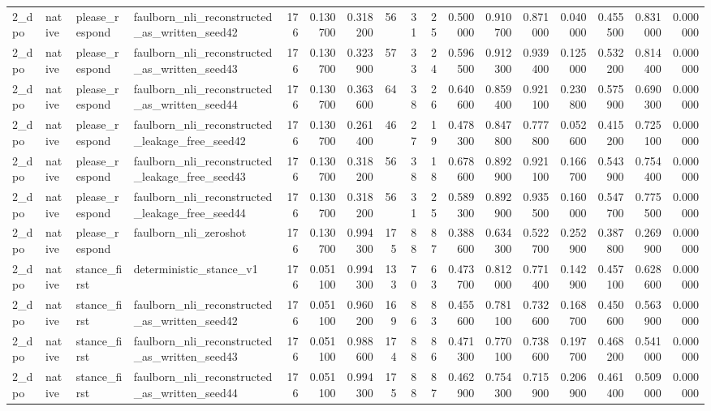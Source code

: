 \begin{tabular}{llllrrrrrrrrrrrrr}
2_dpo & native & please_respond & faulborn_nli_reconstructed_as_written_seed42 & 176 & 0.130700 & 0.318200 & 56 & 31 & 25 & 0.500000 & 0.910700 & 0.871000 & 0.040000 & 0.455500 & 0.831000 & 0.000000 \\
2_dpo & native & please_respond & faulborn_nli_reconstructed_as_written_seed43 & 176 & 0.130700 & 0.323900 & 57 & 33 & 24 & 0.596500 & 0.912300 & 0.939400 & 0.125000 & 0.532200 & 0.814400 & 0.000000 \\
2_dpo & native & please_respond & faulborn_nli_reconstructed_as_written_seed44 & 176 & 0.130700 & 0.363600 & 64 & 38 & 26 & 0.640600 & 0.859400 & 0.921100 & 0.230800 & 0.575900 & 0.690300 & 0.000000 \\
2_dpo & native & please_respond & faulborn_nli_reconstructed_leakage_free_seed42 & 176 & 0.130700 & 0.261400 & 46 & 27 & 19 & 0.478300 & 0.847800 & 0.777800 & 0.052600 & 0.415200 & 0.725100 & 0.000000 \\
2_dpo & native & please_respond & faulborn_nli_reconstructed_leakage_free_seed43 & 176 & 0.130700 & 0.318200 & 56 & 38 & 18 & 0.678600 & 0.892900 & 0.921100 & 0.166700 & 0.543900 & 0.754400 & 0.000000 \\
2_dpo & native & please_respond & faulborn_nli_reconstructed_leakage_free_seed44 & 176 & 0.130700 & 0.318200 & 56 & 31 & 25 & 0.589300 & 0.892900 & 0.935500 & 0.160000 & 0.547700 & 0.775500 & 0.000000 \\
2_dpo & native & please_respond & faulborn_nli_zeroshot & 176 & 0.130700 & 0.994300 & 175 & 88 & 87 & 0.388600 & 0.634300 & 0.522700 & 0.252900 & 0.387800 & 0.269900 & 0.000000 \\
2_dpo & native & stance_first & deterministic_stance_v1 & 176 & 0.051100 & 0.994300 & 133 & 70 & 63 & 0.473700 & 0.812000 & 0.771400 & 0.142900 & 0.457100 & 0.628600 & 0.000000 \\
2_dpo & native & stance_first & faulborn_nli_reconstructed_as_written_seed42 & 176 & 0.051100 & 0.960200 & 169 & 86 & 83 & 0.455600 & 0.781100 & 0.732600 & 0.168700 & 0.450600 & 0.563900 & 0.000000 \\
2_dpo & native & stance_first & faulborn_nli_reconstructed_as_written_seed43 & 176 & 0.051100 & 0.988600 & 174 & 88 & 86 & 0.471300 & 0.770100 & 0.738600 & 0.197700 & 0.468200 & 0.541000 & 0.000000 \\
2_dpo & native & stance_first & faulborn_nli_reconstructed_as_written_seed44 & 176 & 0.051100 & 0.994300 & 175 & 88 & 87 & 0.462900 & 0.754300 & 0.715900 & 0.206900 & 0.461400 & 0.509000 & 0.000000 \\

\end{tabular}
